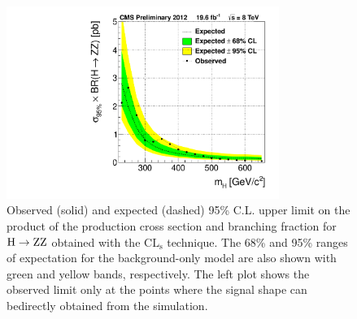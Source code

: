 \begin{figure}[htbp]
 \begin{center}
 \centerline{
 \includegraphics[width=0.79\textwidth]{plots/xs_limit_observed_all-btag_ll.pdf}
}
\caption{
Observed (solid) and expected (dashed) 95\% C.L. upper limit on the product of the production cross section and branching fraction for $\mathrm{\mathrm{H}\rightarrow\mathrm{Z}\mathrm{Z}}$ obtained with the $\mathrm{CL_s}$ technique. The 68\% and 95\% ranges of expectation for the background-only model are also shown with green and yellow bands, respectively. The left plot shows the observed limit only at the points where the signal shape can bedirectly obtained from the simulation.
}
\label{fig:limitxs}
\end{center}
\end{figure}

%


